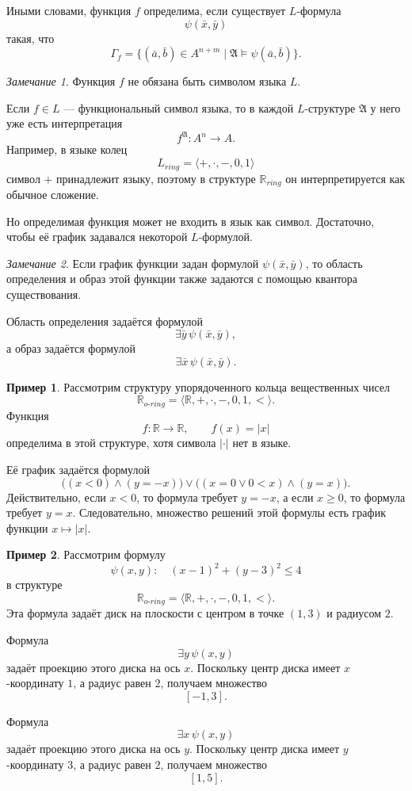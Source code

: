 \documentclass[12pt,a4paper,oneside,openany]{book}
\theoremstyle{definition}
\newtheorem{example}{Пример}[chapter]
\theoremstyle{plain}
\theoremstyle{remark}
\newtheorem{remark}{Замечание}[chapter]
\begin{document}
Иными словами, функция $f$ определима, если существует $L$-формула
\[
\psi(\bar x,\bar y)
\]
такая, что
\[
\Gamma_f
=
\{(\bar a,\bar b)\in A^{n+m}\mid
\mathfrak A\models\psi(\bar a,\bar b)\}.
\]

\begin{remark}
Функция $f$ не обязана быть символом языка $L$.

Если $f\in L$ — функциональный символ языка, то в каждой $L$-структуре $\mathfrak A$ у него уже есть интерпретация
\[
f^{\mathfrak A}:A^n\to A.
\]
Например, в языке колец
\[
L_{ring}=\langle +,\cdot,-,0,1\rangle
\]
символ $+$ принадлежит языку, поэтому в структуре $\mathbb R_{ring}$ он интерпретируется как обычное сложение.

Но определимая функция может не входить в язык как символ. Достаточно, чтобы её график задавался некоторой $L$-формулой.
\end{remark}

\begin{remark}
Если график функции задан формулой $\psi(\bar x,\bar y)$, то область определения и образ этой функции также задаются с помощью квантора существования.

Область определения задаётся формулой
\[
\exists \bar y\,\psi(\bar x,\bar y),
\]
а образ задаётся формулой
\[
\exists \bar x\,\psi(\bar x,\bar y).
\]
\end{remark}

\begin{example}
Рассмотрим структуру упорядоченного кольца вещественных чисел
\[
\mathbb R_{o\text{-}ring}
=
\langle \mathbb R,+,\cdot,-,0,1,<\rangle.
\]
Функция
\[
f:\mathbb R\to\mathbb R,
\qquad
f(x)=|x|
\]
определима в этой структуре, хотя символа $|\cdot|$ нет в языке.

Её график задаётся формулой
\[
\bigl((x<0)\wedge(y=-x)\bigr)
\vee
\bigl((x=0\vee 0<x)\wedge(y=x)\bigr).
\]
Действительно, если $x<0$, то формула требует $y=-x$, а если $x\ge 0$, то формула требует $y=x$.
Следовательно, множество решений этой формулы есть график функции $x\mapsto |x|$.
\end{example}

\begin{example}
Рассмотрим формулу
\[
\psi(x,y):\quad (x-1)^2+(y-3)^2\le 4
\]
в структуре
\[
\mathbb R_{o\text{-}ring}
=
\langle \mathbb R,+,\cdot,-,0,1,<\rangle.
\]
Эта формула задаёт диск на плоскости с центром в точке $(1,3)$ и радиусом $2$.

Формула
\[
\exists y\,\psi(x,y)
\]
задаёт проекцию этого диска на ось $x$. Поскольку центр диска имеет $x$-координату $1$, а радиус равен $2$, получаем множество
\[
[-1,3].
\]

Формула
\[
\exists x\,\psi(x,y)
\]
задаёт проекцию этого диска на ось $y$. Поскольку центр диска имеет $y$-координату $3$, а радиус равен $2$, получаем множество
\[
[1,5].
\]
\end{example}
\end{document}
